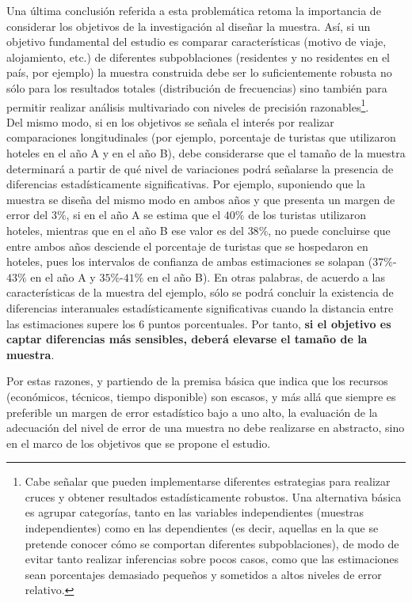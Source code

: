 \documentclass[
]{book}
\begin{document}
Una última conclusión referida a esta problemática retoma la importancia de considerar los objetivos de la investigación al diseñar la muestra. Así, si un objetivo fundamental del estudio es comparar características (motivo de viaje, alojamiento, etc.) de diferentes subpoblaciones (residentes y no residentes en el país, por ejemplo) la muestra construida debe ser lo suficientemente robusta no sólo para los resultados totales (distribución de frecuencias) sino también para permitir realizar análisis multivariado con niveles de precisión razonables\footnote{Cabe señalar que pueden implementarse diferentes estrategias para realizar cruces y obtener resultados estadísticamente robustos. Una alternativa básica es agrupar categorías, tanto en las variables independientes (muestras independientes) como en las dependientes (es decir, aquellas en la que se pretende conocer cómo se comportan diferentes subpoblaciones), de modo de evitar tanto realizar inferencias sobre pocos casos, como que las estimaciones sean porcentajes demasiado pequeños y sometidos a altos niveles de error relativo.}.\\

Del mismo modo, si en los objetivos se señala el interés por realizar comparaciones longitudinales (por ejemplo, porcentaje de turistas que utilizaron hoteles en el año A y en el año B), debe considerarse que el tamaño de la muestra determinará a partir de qué nivel de variaciones podrá señalarse la presencia de diferencias estadísticamente significativas. Por ejemplo, suponiendo que la muestra se diseña del mismo modo en ambos años y que presenta un margen de error del \(3\%\), si en el año A se estima que el \(40\%\) de los turistas utilizaron hoteles, mientras que en el año B ese valor es del \(38\%\), no puede concluirse que entre ambos años desciende el porcentaje de turistas que se hospedaron en hoteles, pues los intervalos de confianza de ambas estimaciones se solapan (\(37\%\)-\(43\%\) en el año A y \(35\%\)-\(41\%\) en el año B). En otras palabras, de acuerdo a las características de la muestra del ejemplo, sólo se podrá concluir la existencia de diferencias interanuales estadísticamente significativas cuando la distancia entre las estimaciones supere los 6 puntos porcentuales. Por tanto, \textbf{si el objetivo es captar diferencias más sensibles, deberá elevarse el tamaño de la muestra}.

Por estas razones, y partiendo de la premisa básica que indica que los recursos (económicos, técnicos, tiempo disponible) son escasos, y más allá que siempre es preferible un margen de error estadístico bajo a uno alto, la evaluación de la adecuación del nivel de error de una muestra no debe realizarse en abstracto, sino en el marco de los objetivos que se propone el estudio.
\end{document}
